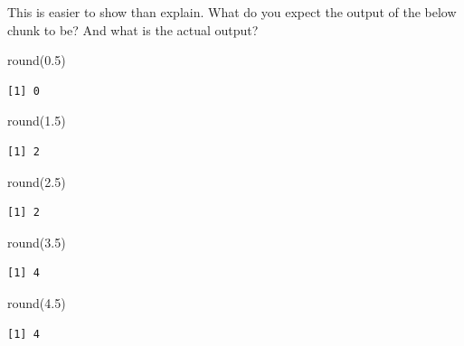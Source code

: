 \documentclass[
  letterpaper,
  DIV=11,
  numbers=noendperiod]{scrreprt}
\newenvironment{Shaded}{\begin{snugshade}}{\end{snugshade}}
\newcommand{\FloatTok}[1]{\textcolor[rgb]{0.68,0.00,0.00}{#1}}
\newcommand{\FunctionTok}[1]{\textcolor[rgb]{0.28,0.35,0.67}{#1}}
\newcommand{\NormalTok}[1]{\textcolor[rgb]{0.00,0.23,0.31}{#1}}
\begin{document}
This is easier to show than explain. What do you expect the output of
the below chunk to be? And what is the actual output?

\begin{Shaded}
\begin{Highlighting}[]
\FunctionTok{round}\NormalTok{(}\FloatTok{0.5}\NormalTok{)}
\end{Highlighting}
\end{Shaded}

\begin{verbatim}
[1] 0
\end{verbatim}

\begin{Shaded}
\begin{Highlighting}[]
\FunctionTok{round}\NormalTok{(}\FloatTok{1.5}\NormalTok{)}
\end{Highlighting}
\end{Shaded}

\begin{verbatim}
[1] 2
\end{verbatim}

\begin{Shaded}
\begin{Highlighting}[]
\FunctionTok{round}\NormalTok{(}\FloatTok{2.5}\NormalTok{)}
\end{Highlighting}
\end{Shaded}

\begin{verbatim}
[1] 2
\end{verbatim}

\begin{Shaded}
\begin{Highlighting}[]
\FunctionTok{round}\NormalTok{(}\FloatTok{3.5}\NormalTok{)}
\end{Highlighting}
\end{Shaded}

\begin{verbatim}
[1] 4
\end{verbatim}

\begin{Shaded}
\begin{Highlighting}[]
\FunctionTok{round}\NormalTok{(}\FloatTok{4.5}\NormalTok{)}
\end{Highlighting}
\end{Shaded}

\begin{verbatim}
[1] 4
\end{verbatim}
\end{document}

